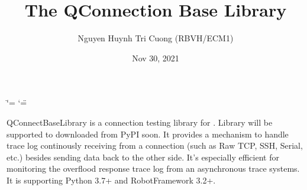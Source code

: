 \documentclass[letterpaper,10pt,english]{sphinxmanual}
\title{The QConnection Base Library}
\date{Nov 30, 2021}
\author{Nguyen Huynh Tri Cuong (RBVH/ECM1)}
\begin{document}
\ifdefined\shorthandoff
  \ifnum\catcode`\=\string=\active\shorthandoff{=}\fi
  \ifnum\catcode`\"=\active{}\fi
\fi

\pagestyle{empty}
\sphinxmaketitle
\pagestyle{plain}
\sphinxtableofcontents
\pagestyle{normal}
\label{\detokenize{index::doc}}




\sphinxAtStartPar
{\hyperref[\detokenize{index:license}]{\emph{}}}

\sphinxAtStartPar
QConnectBaseLibrary is a connection testing library for . Library will be supported to
downloaded from PyPI soon. It provides a mechanism to handle trace log
continously receiving from a connection (such as Raw TCP, SSH, Serial,
etc.) besides sending data back to the other side. It’s especially
efficient for monitoring the overflood response trace log from an
asynchronous trace systems. It is supporting Python 3.7+ and
RobotFramework 3.2+.
\end{document}
